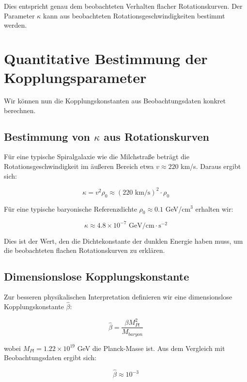 \documentclass[a4paper,12pt]{article}
\begin{document}
Dies entspricht genau dem beobachteten Verhalten flacher Rotationskurven. Der Parameter $\kappa$ kann aus beobachteten Rotationsgeschwindigkeiten bestimmt werden.

\section{Quantitative Bestimmung der Kopplungsparameter}

Wir können nun die Kopplungskonstanten aus Beobachtungsdaten konkret berechnen.

\subsection{Bestimmung von $\kappa$ aus Rotationskurven}

Für eine typische Spiralgalaxie wie die Milchstraße beträgt die Rotationsgeschwindigkeit im äußeren Bereich etwa $v \approx 220$ km/s. Daraus ergibt sich:

\begin{equation}
\kappa = v^2 \rho_0 \approx (220 \text{ km/s})^2 \cdot \rho_0
\end{equation}

Für eine typische baryonische Referenzdichte $\rho_0 \approx 0.1$ GeV/cm$^3$ erhalten wir:

\begin{equation}
\kappa \approx 4.8 \times 10^{-7} \text{ GeV/cm} \cdot \text{s}^{-2}
\end{equation}

Dies ist der Wert, den die Dichtekonstante der dunklen Energie haben muss, um die beobachteten flachen Rotationskurven zu erklären.

\subsection{Dimensionslose Kopplungskonstante}

Zur besseren physikalischen Interpretation definieren wir eine dimensionslose Kopplungskonstante $\hat{\beta}$:

\begin{equation}
\hat{\beta} = \frac{\beta M_{Pl}^2}{M_{baryon}}
\end{equation}

wobei $M_{Pl} = 1.22 \times 10^{19}$ GeV die Planck-Masse ist. Aus dem Vergleich mit Beobachtungsdaten ergibt sich:

\begin{equation}
\hat{\beta} \approx 10^{-3}
\end{equation}
\end{document}

